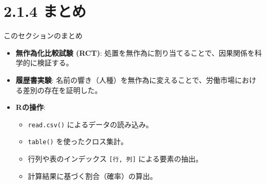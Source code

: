 \documentclass[
  ignorenonframetext,
]{beamer}
\providecommand{\tightlist}{%
  \setlength{\itemsep}{0pt}\setlength{\parskip}{0pt}}
\begin{document}
\hypertarget{ux307eux3068ux3081}{%
\section{2.1.4 まとめ}\label{ux307eux3068ux3081}}

\begin{frame}[fragile]{このセクションのまとめ}
\protect\hypertarget{ux3053ux306eux30bbux30afux30b7ux30e7ux30f3ux306eux307eux3068ux3081}{}
\begin{itemize}
\tightlist
\item
  \textbf{無作為化比較試験 (RCT)}:
  処置を無作為に割り当てることで、因果関係を科学的に検証する。
\item
  \textbf{履歴書実験}:
  名前の響き（人種）を無作為に変えることで、労働市場における差別の存在を証明した。
\item
  \textbf{Rの操作}:

  \begin{itemize}
  \tightlist
  \item
    \texttt{read.csv()} によるデータの読み込み。
  \item
    \texttt{table()} を使ったクロス集計。
  \item
    行列や表のインデックス \texttt{{[}行,\ 列{]}} による要素の抽出。
  \item
    計算結果に基づく割合（確率）の算出。
  \end{itemize}
\end{itemize}
\end{frame}
\end{document}
